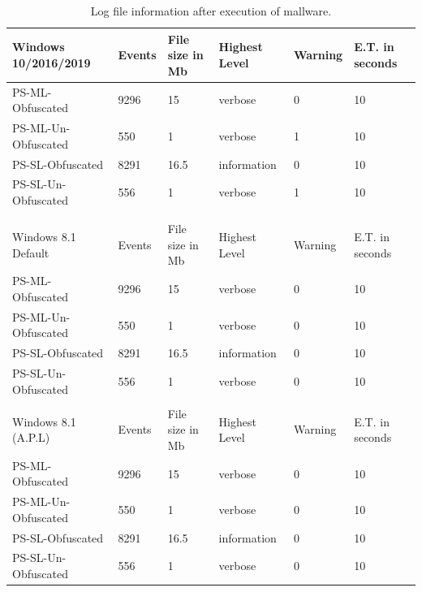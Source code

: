 \documentclass{article}%
\begin{document}
\begin{table}
\caption {Log file information after execution of mallware.}
\label{tab:table_six}
\begin{center}
\begin{tabular}{|l|l|l|l|l|l|}
\hline
Windows 10/2016/2019 & Events & File size in Mb & Highest Level & Warning & E.T. in seconds  \\\hline
PS-ML-Obfuscated     & 9296   & 15              & verbose       & 0       & 10               \\\hline
PS-ML-Un-Obfuscated  & 550    & 1               & verbose       & 1       & 10               \\\hline
PS-SL-Obfuscated     & 8291   & 16.5            & information   & 0       & 10               \\\hline
PS-SL-Un-Obfuscated  & 556    & 1               & verbose       & 1       & 10               \\\hline
                     &        &                 &               &         &                  \\\hline
                     &        &                 &               &         &                  \\\hline
Windows 8.1 Default  & Events & File size in Mb & Highest Level & Warning & E.T. in seconds  \\\hline
PS-ML-Obfuscated     & 9296   & 15              & verbose       & 0       & 10               \\\hline
PS-ML-Un-Obfuscated  & 550    & 1               & verbose       & 0       & 10               \\\hline
PS-SL-Obfuscated     & 8291   & 16.5            & information   & 0       & 10               \\\hline
PS-SL-Un-Obfuscated  & 556    & 1               & verbose       & 0       & 10               \\\hline
                     &        &                 &               &         &                  \\\hline
Windows 8.1 (A.P.L)  & Events & File size in Mb & Highest Level & Warning & E.T. in seconds  \\\hline
PS-ML-Obfuscated     & 9296   & 15              & verbose       & 0       & 10               \\\hline
PS-ML-Un-Obfuscated  & 550    & 1               & verbose       & 0       & 10               \\\hline
PS-SL-Obfuscated     & 8291   & 16.5            & information   & 0       & 10               \\\hline
PS-SL-Un-Obfuscated  & 556    & 1               & verbose       & 0       & 10               \\\hline
\end{tabular}
\end{center}
\end{table}
\end{document}
